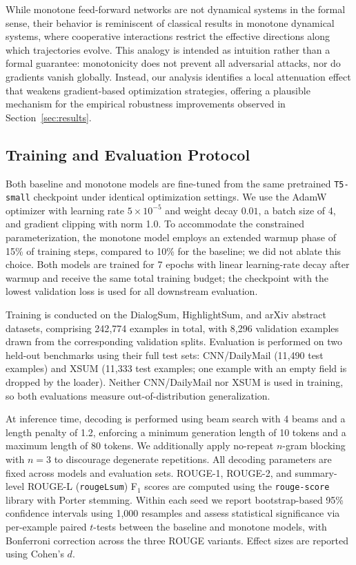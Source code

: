 \documentclass{article}
\theoremstyle{plain}
\theoremstyle{definition}
\theoremstyle{remark}
\theoremstyle{plain}
\begin{document}
While monotone feed-forward networks are not dynamical systems in the formal
sense, their behavior is reminiscent of classical results in monotone dynamical
systems, where cooperative interactions restrict the effective directions along
which trajectories evolve. This analogy is intended as intuition rather than a
formal guarantee: monotonicity does not prevent all adversarial attacks, nor do
gradients vanish globally. Instead, our analysis identifies a local attenuation
effect that weakens gradient-based optimization strategies, offering a plausible
mechanism for the empirical robustness improvements observed in
Section~\ref{sec:results}.




\subsection{Training and Evaluation Protocol}
\label{app:training}
Both baseline and monotone models are fine-tuned from the same pretrained \texttt{T5-small} checkpoint under identical optimization settings. We use the AdamW optimizer with learning rate $5 \times 10^{-5}$ and weight decay $0.01$, a batch size of 4, and gradient clipping with norm 1.0. To accommodate the constrained parameterization, the monotone model employs an extended warmup phase of 15\% of training steps, compared to 10\% for the baseline; we did not ablate this choice. Both models are trained for 7 epochs with linear learning-rate decay after warmup and receive the same total training budget; the checkpoint with the lowest validation loss is used for all downstream evaluation.

Training is conducted on the DialogSum, HighlightSum, and arXiv abstract datasets, comprising 242{,}774 examples in total, with 8{,}296 validation examples drawn from the corresponding validation splits.
Evaluation is performed on two held-out benchmarks using their full test sets: CNN/DailyMail (11{,}490 test examples) and XSUM (11{,}333 test examples; one example with an empty field is dropped by the loader).
Neither CNN/DailyMail nor XSUM is used in training, so both evaluations measure out-of-distribution generalization.

At inference time, decoding is performed using beam search with 4 beams and a length penalty of 1.2, enforcing a minimum generation length of 10 tokens and a maximum length of 80 tokens. We additionally apply no-repeat $n$-gram blocking with $n=3$ to discourage degenerate repetitions. All decoding parameters are fixed across models and evaluation sets.
ROUGE-1, ROUGE-2, and summary-level ROUGE-L (\texttt{rougeLsum}) F$_1$ scores are computed using the \texttt{rouge-score} library with Porter stemming. Within each seed we report bootstrap-based 95\% confidence intervals using 1{,}000 resamples and assess statistical significance via per-example paired $t$-tests between the baseline and monotone models, with Bonferroni correction across the three ROUGE variants. Effect sizes are reported using Cohen's $d$.
\end{document}
